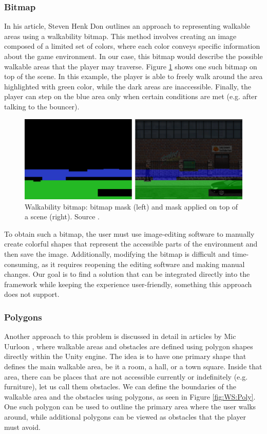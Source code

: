 \subsubsection{Bitmap}
In his article, Steven Henk Don \cite{Shdon} outlines an approach to representing walkable areas using a walkability bitmap. This method involves creating an image composed of a limited set of colors, where each color conveys specific information about the game environment. In our case, this bitmap would describe the possible walkable areas that the player may traverse. Figure \ref{fig:WS:Bitmap} shows one such bitmap on top of the scene. In this example, the player is able to freely walk around the area highlighted with green color, while the dark areas are inaccessible. Finally, the player can step on the blue area only when certain conditions are met (e.g. after talking to the bouncer).  

\begin{figure}[H]
\centering
\includegraphics[width=1.0\linewidth]{img/walkability-map2.png}
\caption{Walkability bitmap: bitmap mask (left) and mask applied on top of a scene (right). Source \cite{Shdon}.}
\label{fig:WS:Bitmap}
\end{figure}

To obtain such a bitmap, the user must use image-editing software to manually create colorful shapes that represent the accessible parts of the environment and then save the image. Additionally, modifying the bitmap is difficult and time-consuming, as it requires reopening the editing software and making manual changes. Our goal is to find a solution that can be integrated directly into the framework while keeping the experience user-friendly, something this approach does not support. 

\subsubsection{Polygons}
Another approach to this problem is discussed in detail in articles by Mic Uurloon \cite{Uurloon1}\cite{Uurloon2}, where walkable areas and obstacles are defined using polygon shapes directly within the Unity engine. The idea is to have one primary shape that defines the main walkable area, be it a room, a hall, or a town square. Inside that area, there can be places that are not accessible currently or indefinitely (e.g. furniture), let us call them obstacles. We can define the boundaries of the walkable area and the obstacles using polygons, as seen in Figure \ref{fig:WS:Poly}. One such polygon can be used to outline the primary area where the user walks around, while additional polygons can be viewed as obstacles that the player must avoid.

